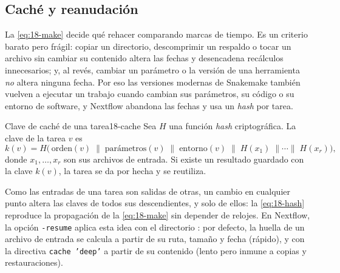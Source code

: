 \subsection{Caché y reanudación}

La \cref{eq:18-make} decide qué rehacer comparando marcas de tiempo. Es un criterio barato pero frágil: copiar un directorio, descomprimir un respaldo o tocar un archivo sin cambiar su contenido altera las fechas y desencadena recálculos innecesarios; y, al revés, cambiar un parámetro o la versión de una herramienta \emph{no} altera ninguna fecha. Por eso las versiones modernas de Snakemake también vuelven a ejecutar un trabajo cuando cambian sus parámetros, su código o su entorno de software, y Nextflow abandona las fechas y usa un \emph{hash} por tarea.

\begin{definicion}{Clave de caché de una tarea}{18-cache}
Sea $H$ una función \emph{hash} criptográfica. La clave de la tarea $v$ es
\begin{equation}\label{eq:18-hash}
k(v) = H\Big(\,\text{orden}(v)\;\big\|\;\text{parámetros}(v)\;\big\|\;\text{entorno}(v)\;\big\|\;H(x_1)\;\big\|\cdots\big\|\;H(x_r)\Big),
\end{equation}
donde $x_1,\dots,x_r$ son sus archivos de entrada. Si existe un resultado guardado con la clave $k(v)$, la tarea se da por hecha y se reutiliza.
\end{definicion}

\begin{simbolos}
\end{simbolos}

Como las entradas de una tarea son salidas de otras, un cambio en cualquier punto altera las claves de todos sus descendientes, y solo de ellos: la \cref{eq:18-hash} reproduce la propagación de la \cref{eq:18-make} sin depender de relojes. En Nextflow, la opción \texttt{-resume} aplica esta idea con el directorio : por defecto, la huella de un archivo de entrada se calcula a partir de su ruta, tamaño y fecha (rápido), y con la directiva \texttt{cache 'deep'} a partir de su contenido (lento pero inmune a copias y restauraciones).

